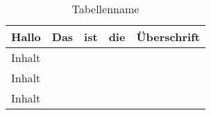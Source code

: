 \begin{table}[h]
\begin{tabular}{l|l|l|l|l}
Hallo  & Das & ist & die & Überschrift \\ \hline
Inhalt &     &     &     &             \\
Inhalt &     &     &     &             \\
Inhalt &     &     &     &            
\end{tabular}
\caption{Tabellenname}
\end{table}